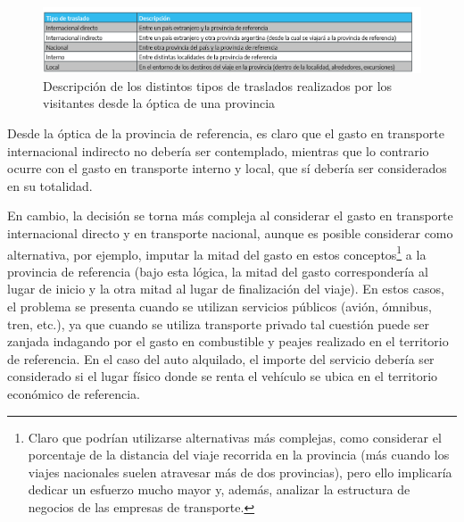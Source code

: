 \documentclass[
]{book}
\begin{document}
\begin{figure}

{\centering \includegraphics[width=1\linewidth]{imagenes/tabla_5} 

}

\caption{Descripción de los distintos tipos de traslados realizados por los visitantes desde la óptica de una provincia}\label{fig:Tipodetraslado}
\end{figure}

Desde la óptica de la provincia de referencia, es claro que el gasto en transporte internacional indirecto no debería ser contemplado, mientras que lo contrario ocurre con el gasto en transporte interno y local, que sí debería ser considerados en su totalidad.

En cambio, la decisión se torna más compleja al considerar el gasto en transporte internacional directo y en transporte nacional, aunque es posible considerar como alternativa, por ejemplo, imputar la mitad del gasto en estos conceptos\footnote{Claro que podrían utilizarse alternativas más complejas, como considerar el porcentaje de la distancia del viaje recorrida en la provincia (más cuando los viajes nacionales suelen atravesar más de dos provincias), pero ello implicaría dedicar un esfuerzo mucho mayor y, además, analizar la estructura de negocios de las empresas de transporte.} a la provincia de referencia (bajo esta lógica, la mitad del gasto correspondería al lugar de inicio y la otra mitad al lugar de finalización del viaje). En estos casos, el problema se presenta cuando se utilizan servicios públicos (avión, ómnibus, tren, etc.), ya que cuando se utiliza transporte privado tal cuestión puede ser zanjada indagando por el gasto en combustible y peajes realizado en el territorio de referencia. En el caso del auto alquilado, el importe del servicio debería ser considerado si el lugar físico donde se renta el vehículo se ubica en el territorio económico de referencia.
\end{document}
